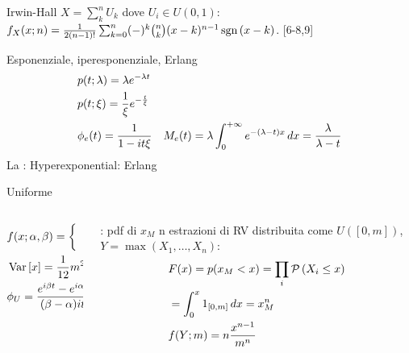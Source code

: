 \documentclass[asd-beamer.tex]{subfiles}
\begin{document}
\begin{frame}{Irwin-Hall}
$X=\sum_k^nU_k$ dove $U_i\in U(0,1)$: $f_X(x;n)=\frac{1}{2(n-1)!}\sum_{k=0}^n(-)^k\binom{n}{k}(x-k)^{n-1}\operatorname{sgn}{(x-k)}$.
[6-8,9]
    
\end{frame}

\begin{frame}{Esponenziale, iperesponenziale, Erlang}
\begin{align*}
&p(t;\lambda)=\lambda e^{-\lambda t}\\
&p(t;\xi)=\frac{1}{\xi}e^{-\frac{t}{\xi}}\\
&\phi_e(t)=\frac{1}{1-it\xi}
&M_e(t)=\lambda\int_{0}^{+\infty}{}e^{-(\lambda-t)x}\,dx=\frac{\lambda}{\lambda-t}
\end{align*}
La : 
Hyperexponential:
Erlang
\end{frame}

\begin{frame}{Uniforme}
\begin{columns}[T]
	\begin{column}{0.5\textwidth}
	\begin{align*}
	&f(x;\alpha,\beta)=\left\{\begin{array}{c}\frac{1}{\beta-\alpha}\\0\\
	\end{array}\right.\\
	&\operatorname{Var}{[x]}=\frac{1}{12}m^2\\
	&\phi_U=\frac{e^{i\beta t}-e^{i\alpha t}}{(\beta-\alpha)it}
	\end{align*}
	\end{column}
	\begin{column}{0.5\textwidth}
	\begin{block}{: pdf di $x_M$}
		n estrazioni di RV distribuita come $U([0,m])$, $Y=\max{(X_1,\ldots,X_n)}$:
		\begin{align*}
		&F(x)=p(x_M<x)=\prod_i\operatorname{\mathcal{P}}{(X_i\leq x)}\\
		&=\int_0^x1_{[0,m]}\,dx=x_M^n\\
		&f(Y;m)=n\frac{x^{n-1}}{m^n}
		\end{align*}
	\end{block}
\end{column}
\end{columns}
\end{frame}
\end{document}
